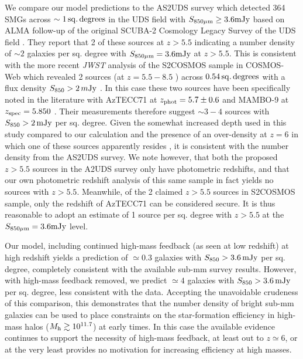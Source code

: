 \documentclass[fleqn,usenatbib]{mnras}
\begin{document}
We compare our model predictions to the AS2UDS survey which detected 364 SMGs across $\sim1 \, \rm sq.\, degrees$ in the UDS field with $S_{\rm 850\mu m} \ge 3.6 \rm mJy$ based on ALMA follow-up of the original SCUBA-2 Cosmology Legacy Survey of the UDS field \citep{dudzeviciute2020}. They report that 2 of these sources at $z>5.5$ indicating a number density of $\sim2$ galaxies per sq. degree with $S_{\rm 850\mu m}=3.6 \rm mJy$ at $z>5.5$. This is consistent with the more recent \textit{JWST} analysis of the S2COSMOS sample in COSMOS-Web \citep{caset2023b} which revealed 2 sources (at $z=5.5-8.5$ ) across $0.54 \, \rm sq.\, degrees$ with a flux density $S_{850}>2\, m \rm Jy$ \citep{mckinney2024}. In this case these two sources have been specifically noted in the literature with AzTECC71 at $z_{\rm phot}=5.7 \pm 0.6$ \citep{mckinney2023} and MAMBO-9 at $z_{\rm spec}=5.850$ \citep{casey2019}. Their measurements therefore suggest $\sim3-4$ sources with $S_{850}>2\, \rm mJy$ per sq. degree. Given the somewhat increased depth used in this study compared to our calculation and the presence of an over-density at $z=6$ in which one of these sources apparently resides \citep{brinch2024}, it is consistent with the number density from the AS2UDS survey. We note however, that both the proposed $z > 5.5$ sources in the A2UDS survey only have photometric redshifts, and that our own photometric redshift analysis of this same sample in fact yields no sources with $z > 5.5$. Meanwhile, of the 2 claimed $z > 5.5$ sources in S2COSMOS sample, only the redshift of AzTECC71 can be considered secure. It is thus reasonable to adopt an estimate of 1 source per sq. degree with $z > 5.5$ at the $S_{\rm 850\mu m}=3.6 \rm mJy$ level.

Our model, including continued high-mass feedback (as seen at low redshift) at high redshift yields a prediction of $\simeq0.3$ galaxies with $S_{850}>3.6\, \rm mJy$ per sq. degree, completely consistent with the available sub-mm survey results. However, with high-mass feedback removed, we predict $\simeq4$ galaxies with $S_{850}>3.6\, \rm mJy$ per sq. degree, less consistent with the data. Accepting the unavoidable crudeness of this comparison, this demonstrates that the number density of bright sub-mm galaxies can be used to place constraints on the star-formation efficiency in high-mass halos ($M_{\rm h}\gtrsim10^{11.7}$) at early times. In this case the available evidence continues to support the necessity of high-mass feedback, at least out to $z \simeq 6$, or at the very least provides no motivation for increasing efficiency at high masses.
 
\end{document}
